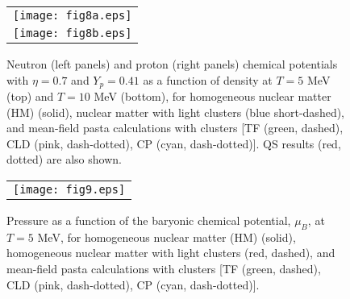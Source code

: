 \documentclass[aps,prc,nofootinbib,twocolumn,showpacs]{revtex4-1}
\begin{document}
\begin{figure*}[!htbp]
\begin{tabular}{c}
     \texttt{[image: fig8a.eps]}\\
      \texttt{[image: fig8b.eps]}
\end{tabular}
    \caption{Neutron (left panels) and proton (right panels) chemical potentials
with $\eta=0.7$ and $Y_p=0.41$ as a function of density at $T=5$ MeV (top)
    and  $T=10$ MeV (bottom),
    for homogeneous nuclear matter (HM) (solid), nuclear matter with light
    clusters (blue short-dashed), and mean-field pasta calculations with
    clusters [TF (green, dashed), CLD (pink, dash-dotted), CP (cyan, dash-dotted)]. QS results (red, dotted) are also shown. }
\label{fig8}
\end{figure*}

\begin{figure}[!htbp]
\begin{tabular}{c}
     \texttt{[image: fig9.eps]}
\end{tabular}
    \caption{Pressure as a function of the baryonic chemical potential, $\mu_B$, 
  at $T=5$ MeV, for homogeneous nuclear matter (HM) (solid), homogeneous nuclear matter with light clusters (red, dashed), and mean-field pasta calculations with    clusters [TF (green, dashed), CLD (pink, dash-dotted), CP (cyan, dash-dotted)]. }
\label{fig9}
\end{figure}
    
\end{document}
